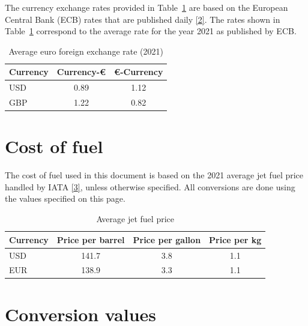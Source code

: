 \documentclass[
  11pt,
  a4paper,
]{book}
\begin{document}

The currency exchange rates provided in
Table~\ref{tbl-eurostat-exchange-rates} are based on the European
Central Bank (ECB) rates that are published daily
\protect\hyperlink{ref-ECB:exchange_rates}{{[}2{]}}. The rates shown in
Table~\ref{tbl-eurostat-exchange-rates} correspond to the average rate
for the year 2021 as published by ECB.

\hypertarget{tbl-eurostat-exchange-rates}{}
\begin{longtable}{lcc}
\caption{\label{tbl-eurostat-exchange-rates}Average euro foreign exchange rate (2021) }\tabularnewline

\toprule
Currency & Currency-€ & €-Currency \\ 
\midrule
USD & 0.89 & 1.12 \\ 
GBP & 1.22 & 0.82 \\ 
\bottomrule
\end{longtable}

\hypertarget{cost-of-fuel}{%
\section*{Cost of fuel}\label{cost-of-fuel}}


The cost of fuel used in this document is based on the 2021 average jet
fuel price handled by IATA
\protect\hyperlink{ref-iata:JetFuelPrice}{{[}3{]}}, unless otherwise
specified. All conversions are done using the values specified on this
page.

\hypertarget{tbl-cost-of-fuel}{}
\begin{longtable}{lccc}
\caption{\label{tbl-cost-of-fuel}Average jet fuel price }\tabularnewline

\toprule
Currency & Price per barrel & Price per gallon & Price per kg \\ 
\midrule
USD & 141.7 & 3.8 & 1.1 \\ 
EUR & 138.9 & 3.3 & 1.1 \\ 
\bottomrule
\end{longtable}

\hypertarget{conversion-values}{%
\section*{Conversion values}\label{conversion-values}}
\end{document}
